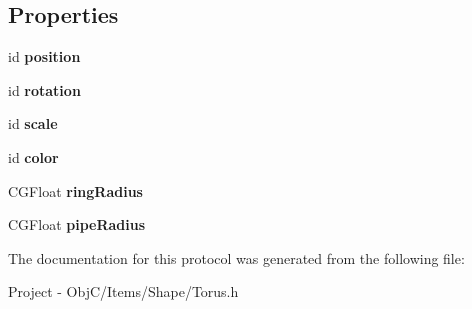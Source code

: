 \subsection*{Properties}
\begin{DoxyCompactItemize}
\item 
\hypertarget{protocol_torus_export-p_af3c7866938df6d29bc6f51b0794b84c1}{}id {\bfseries position}\label{protocol_torus_export-p_af3c7866938df6d29bc6f51b0794b84c1}

\item 
\hypertarget{protocol_torus_export-p_ab7b1de87ad3af323a9ba9dec873c2bd7}{}id {\bfseries rotation}\label{protocol_torus_export-p_ab7b1de87ad3af323a9ba9dec873c2bd7}

\item 
\hypertarget{protocol_torus_export-p_a4231ae304e22058e15d163ef05d653f4}{}id {\bfseries scale}\label{protocol_torus_export-p_a4231ae304e22058e15d163ef05d653f4}

\item 
\hypertarget{protocol_torus_export-p_a84e9ec7e58b5b17610432a549eb2dd55}{}id {\bfseries color}\label{protocol_torus_export-p_a84e9ec7e58b5b17610432a549eb2dd55}

\item 
\hypertarget{protocol_torus_export-p_a180019bb6f599042109b70aa126a8b29}{}C\+G\+Float {\bfseries ring\+Radius}\label{protocol_torus_export-p_a180019bb6f599042109b70aa126a8b29}

\item 
\hypertarget{protocol_torus_export-p_a230240cb3406179ce0d788f95bf8d1b1}{}C\+G\+Float {\bfseries pipe\+Radius}\label{protocol_torus_export-p_a230240cb3406179ce0d788f95bf8d1b1}

\end{DoxyCompactItemize}


The documentation for this protocol was generated from the following file\+:\begin{DoxyCompactItemize}
\item 
Project -\/ Obj\+C/\+Items/\+Shape/Torus.\+h\end{DoxyCompactItemize}
